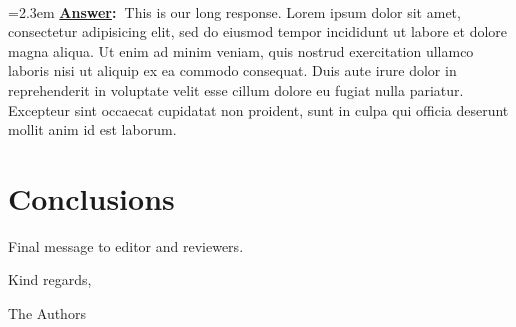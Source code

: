 \documentclass{article}
\newcommand{\answer}[0]{\\\vspace{0.1em} \hangindent=2.3em \textbf{\textcolor{NavyBlue}{\uline{Answer}:~}}}
\begin{document}
\answer This is our long response. Lorem ipsum dolor sit amet, consectetur adipisicing elit, sed do eiusmod tempor incididunt ut labore et dolore magna aliqua. Ut enim ad minim veniam, quis nostrud exercitation ullamco laboris nisi ut aliquip ex ea commodo consequat. Duis aute irure dolor in reprehenderit in voluptate velit esse cillum dolore eu fugiat nulla pariatur. Excepteur sint occaecat cupidatat non proident, sunt in culpa qui officia deserunt mollit anim id est laborum.


\section{Conclusions}

Final message to editor and reviewers.

\hfill Kind regards,

\hfill The Authors
\end{document}
